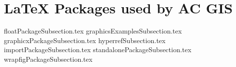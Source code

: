 \documentclass[class=article , crop=false, titlepage, twoside, multi={itemize, figure, verbatim}, float=false]{standalone}
\title{}  %
\begin{document}
\ifstandalone
\maketitle %
\clearpage
\tableofcontents %
\clearpage
\fi

\section[\LaTeX{} Packages]{\LaTeX{} Packages used by AC GIS}

{floatPackageSubsection.tex}
{graphicsExamplesSubsection.tex}
{graphicxPackageSubsection.tex}
{hyperrefSubsection.tex}
{importPackageSubsection.tex}
{standalonePackageSubsection.tex}
{wrapfigPackageSubsection.tex}
\end{document}
